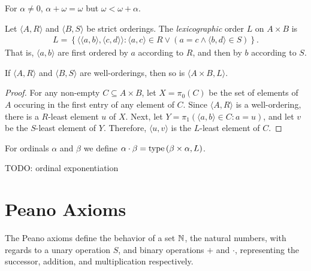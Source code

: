 \begin{prop}
    For $\alpha \neq 0$, $\alpha + \omega = \omega$ but $\omega < \omega + \alpha$.
\end{prop}

\begin{defn}
    Let $\langle A, R\rangle$ and $\langle B, S\rangle$ be strict orderings. The \emph{lexicographic} order $L$ on $A \times B$ is
    \begin{align*}
        L = \left\{\langle \langle a, b \rangle, \langle c, d\rangle\rangle : \langle a, c\rangle \in R \lor \left(a = c \land \langle b, d\rangle \in S\right)\right\}.
    \end{align*}
    That is, $\langle a, b\rangle$ are first ordered by $a$ according to $R$, and then by $b$ according to $S$.
\end{defn}

\begin{lemma}
    If $\langle A, R\rangle$ and $\langle B, S\rangle$ are well-orderings, then so is $\langle A \times B, L\rangle$.
\end{lemma}

\begin{proof}
    For any non-empty $C \subseteq A \times B$, let $X = \pi_{0}(C)$ be the set of elements of $A$ occuring in the first entry of any element of $C$. Since $\langle A, R\rangle$ is a well-ordering, there is a $R$-least element $u$ of $X$. Next, let $Y = \pi_{1}\left(\langle a, b\rangle \in C : a = u\right)$, and let $v$ be the $S$-least element of $Y$. Therefore, $\langle u, v \rangle$ is the $L$-least element of $C$.
\end{proof}

\begin{defn}
    For ordinals $\alpha$ and $\beta$ we define $\alpha \cdot \beta = \operatorname{type}\left(\beta \times \alpha, L\right)$.
\end{defn}

\begin{defn}
    {\color{red}TODO: ordinal exponentiation}
\end{defn}

\section{Peano Axioms}

The Peano axioms define the behavior of a set $\mathbb{N}$, the natural numbers, with regards to a unary operation $S$, and binary operations $+$ and $\cdot$, representing the successor, addition, and multiplication respectively.


